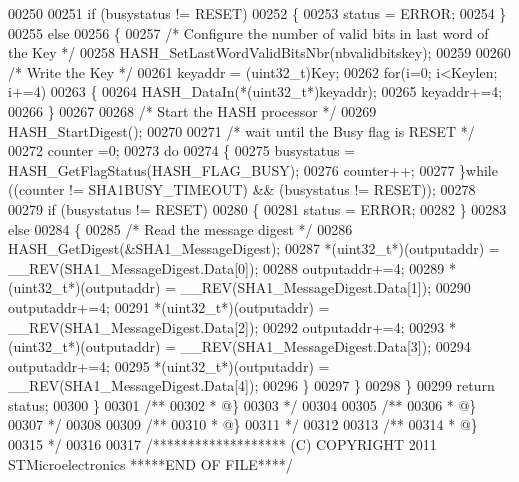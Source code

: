 \begin{DoxyCode}
00250 
00251     \textcolor{keywordflow}{if} (busystatus != RESET)
00252     \{
00253       status = ERROR;
00254     \}
00255     \textcolor{keywordflow}{else}
00256     \{
00257       \textcolor{comment}{/* Configure the number of valid bits in last word of the Key */}
00258       HASH\_SetLastWordValidBitsNbr(nbvalidbitskey);
00259 
00260       \textcolor{comment}{/* Write the Key */}
00261       keyaddr = (uint32\_t)Key;
00262       \textcolor{keywordflow}{for}(i=0; i<Keylen; i+=4)
00263       \{
00264         HASH\_DataIn(*(uint32\_t*)keyaddr);
00265         keyaddr+=4;
00266       \}
00267 
00268       \textcolor{comment}{/* Start the HASH processor */}
00269       HASH\_StartDigest();
00270 
00271       \textcolor{comment}{/* wait until the Busy flag is RESET */}
00272       counter =0;
00273       \textcolor{keywordflow}{do}
00274       \{
00275         busystatus = HASH\_GetFlagStatus(HASH_FLAG_BUSY);
00276         counter++;
00277       \}\textcolor{keywordflow}{while} ((counter != SHA1BUSY_TIMEOUT) && (busystatus != RESET));
00278 
00279       \textcolor{keywordflow}{if} (busystatus != RESET)
00280       \{
00281         status = ERROR;
00282       \}
00283       \textcolor{keywordflow}{else}
00284       \{
00285         \textcolor{comment}{/* Read the message digest */}
00286         HASH\_GetDigest(&SHA1\_MessageDigest);
00287         *(uint32\_t*)(outputaddr)  = \_\_REV(SHA1\_MessageDigest.Data[0]);
00288         outputaddr+=4;
00289         *(uint32\_t*)(outputaddr)  = \_\_REV(SHA1\_MessageDigest.Data[1]);
00290         outputaddr+=4;
00291         *(uint32\_t*)(outputaddr)  = \_\_REV(SHA1\_MessageDigest.Data[2]);
00292         outputaddr+=4;
00293         *(uint32\_t*)(outputaddr)  = \_\_REV(SHA1\_MessageDigest.Data[3]);
00294         outputaddr+=4;
00295         *(uint32\_t*)(outputaddr)  = \_\_REV(SHA1\_MessageDigest.Data[4]);
00296       \}
00297     \}
00298   \}
00299   \textcolor{keywordflow}{return} status;
00300 \}
00301 \textcolor{comment}{/**}
00302 \textcolor{comment}{  * @\}}
00303 \textcolor{comment}{  */}
00304 
00305 \textcolor{comment}{/**}
00306 \textcolor{comment}{  * @\}}
00307 \textcolor{comment}{  */}
00308 
00309 \textcolor{comment}{/**}
00310 \textcolor{comment}{  * @\}}
00311 \textcolor{comment}{  */}
00312 
00313 \textcolor{comment}{/**}
00314 \textcolor{comment}{  * @\}}
00315 \textcolor{comment}{  */}
00316 
00317 \textcolor{comment}{/******************* (C) COPYRIGHT 2011 STMicroelectronics *****END OF FILE****/}
\end{DoxyCode}
